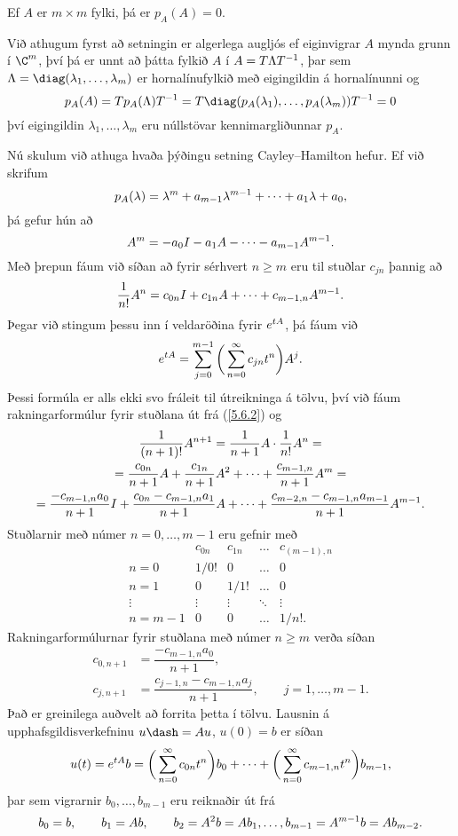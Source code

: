 \begin{se}
Ef $A$ er $m\times m$ fylki, þá er $p_A(A)=0$.

{}
\end{se}

  Við athugum fyrst að setningin er algerlega augljós ef eiginvigrar
$A$ mynda grunn í $\C\sp m$, því þá er unnt að þátta fylkið $A$ í
$A=T\Lambda T\sp{-1}$, þar sem
$\Lambda=\diag(\lambda_1,\dots,\lambda_m)$ er hornalínufylkið með
eigingildin á hornalínunni og 
 $$p_A(A)=Tp_A(\Lambda)T\sp{-1}=
T\diag(p_A(\lambda_1),\dots,p_A(\lambda_m))T\sp{-1}=0
 $$
því eigingildin $\lambda_1,\dots,\lambda_m$ eru núllstövar
kennimargliðunnar $p_A$.

Nú skulum við athuga hvaða þýðingu setning Cayley--Hamilton hefur.
Ef við skrifum 
 $$p_A(\lambda)=\lambda\sp
m+a_{m-1}\lambda\sp{m-1}+\cdots+a_1\lambda+a_0,
 $$
þá gefur hún að 
 \begin{equation*}A\sp m=-a_0I-a_1A-\cdots-a_{m-1}A\sp {m-1}. \label{5.6.2}
 \end{equation*}
Með þrepun fáum við síðan að fyrir sérhvert $n\geq m$ eru til stuðlar
$c_{jn}$ þannig að 
 $$\dfrac 1{n!}A\sp n=
c_{0n}I+c_{1n}A+\cdots+c_{m-1,n}A\sp{m-1}.
 $$
Þegar við stingum þessu inn í veldaröðina fyrir $e\sp{tA}$, þá fáum við
 $$e\sp {tA}= \sum_{j=0}\sp {m-1}\bigg(
\sum_{n=0}\sp\infty c_{jn}t\sp n\bigg)A\sp j.
 $$
Þessi formúla er alls ekki svo fráleit til útreikninga á tölvu, því
við fáum rakningarformúlur fyrir stuðlana út frá (\ref{5.6.2}) og
\begin{multline*}
\dfrac 1{(n+1)!}A\sp{n+1} =\dfrac 1{n+1}A\cdot\dfrac 1{n!}A\sp n=\\
=\dfrac{c_{0n}}{n+1}A+\dfrac{c_{1n}}{n+1}A\sp 2+\cdots
+\dfrac{c_{m-1,n}}{n+1}A\sp m=\\
=\dfrac{-c_{m-1,n}a_0}{n+1}I+\dfrac{c_{0n}-c_{m-1,n}a_1}{n+1}A+
\cdots+\dfrac{c_{m-2,n}-c_{m-1,n}a_{m-1}}{n+1}A\sp{m-1}.
\end{multline*}
Stuðlarnir með númer $n=0,\dots,m-1$ eru gefnir með 
 $$\begin{matrix}
 & c_{0n}& c_{1n}&\dots&c_{(m-1),n}\\
n=0&1/0!&0&\dots&0\\
n=1&0&1/1!&\dots&0\\
\vdots&\vdots&\vdots&\ddots&\vdots\\
n=m-1&0&0&\dots&1/n!.
\end{matrix}
 $$
Rakningarformúlurnar fyrir stuðlana með númer $n\geq m$ verða síðan
\begin{align*}
c_{0,n+1}&= \dfrac{-c_{m-1,n}a_0}{n+1},\\
c_{j,n+1}&= \dfrac{c_{j-1,n}-c_{m-1,n}a_j}{n+1}, 
\qquad j=1,\dots,m-1.
\end{align*}
Það  er greinilega auðvelt að forrita þetta í tölvu.
Lausnin á upphafsgildisverkefninu $u\dash=Au$, $u(0)=b$ er síðan
 $$u(t) =e\sp{tA}b = 
\bigg( \sum_{n=0}\sp\infty c_{0n}t\sp n\bigg) b_0+\cdots+
\bigg( \sum_{n=0}\sp \infty c_{m-1,n}t\sp n\bigg) b_{m-1},
 $$
þar sem vigrarnir $b_0,\dots, b_{m-1}$ eru reiknaðir út frá
 $$
b_0=b, \qquad b_1=Ab, \qquad b_2=A\sp 2b=Ab_1, \dots,
b_{m-1}=A\sp{m-1}b=Ab_{m-2}.
 $$



